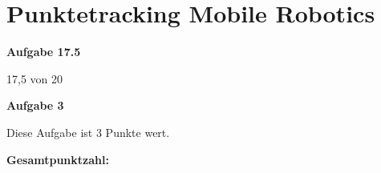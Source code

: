 \documentclass{article}
\newcounter{points}
\newcommand{\addpoints}[1]{\addtocounter{points}{#1}}
\newenvironment{task}[1]
  {
    \par \noindent \textbf{Aufgabe #1} \par
    \addpoints{#1}
  }
  {\par}
\begin{document}
\section*{Punktetracking Mobile Robotics}

\begin{task}{17.5}
17,5 von 20\end{task}

\begin{task}{3}
  Diese Aufgabe ist 3 Punkte wert.
\end{task}

\bigskip
\textbf{Gesamtpunktzahl: \thepoints{}}
\end{document}
